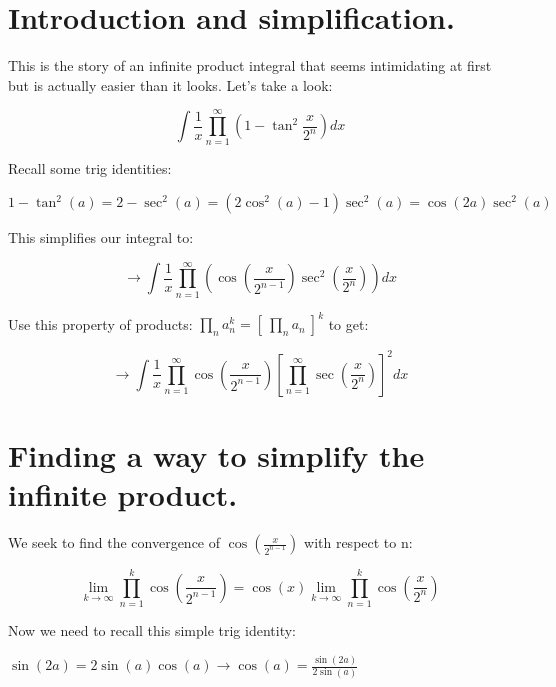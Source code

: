 \documentclass{article}
\begin{document}
\section{Introduction and simplification.}

This is the story of an infinite product integral that seems intimidating at first but is actually easier than it looks. Let's take a look:

\begin{equation}
    \int{ \frac{1}{x} \prod_{n=1}^{\infty} \left( 1-\tan^2{\frac{x}{2^n}} \right) dx}
\end{equation}

Recall some trig identities:

\begin{center}
    $1-\tan^2{(a)}=2-\sec^2{(a)}=\left(2\cos^2{(a)}-1\right)\sec^2{(a)}= \cos{(2a)}\sec^2{(a)}$
\end{center}

This simplifies our integral to:

\begin{equation}
\rightarrow \int{ \frac{1}{x} \prod_{n=1}^{\infty} \left( \cos{\left( \frac{x}{2^{n-1}}\right)} \sec^2{\left( \frac{x}{2^n} \right)}  \right) dx}
\end{equation}

Use this property of products: $\prod_{n}{a_{n}^k}=\left [ \: \prod_n{a_n} \: \right]^k$ to get:

\begin{equation}
    \rightarrow \int{ \frac{1}{x} \prod_{n=1}^{\infty}  \cos{\left( \frac{x}{2^{n-1}}\right)} \left[ \prod_{n=1}^{\infty}\sec{\left( \frac{x}{2^n} \right)}  \right]^2  dx}
\end{equation}

\section{Finding a way to simplify the infinite product.}
We seek to find the convergence of $\cos{ \left( \frac{x}{2^{n-1}} \right) }$ with respect to n:

\begin{equation}
    \lim_{k\rightarrow \infty} {\prod_{n=1}^{k}} \cos{\left( \frac{x}{2^{n-1}}\right)}=\cos{\left(x\right)}\lim_{k\rightarrow \infty} \prod_{n=1}^{k} \cos{\left( \frac{x}{2^n}\right)}
\end{equation}


Now we need to recall this simple trig identity:

\begin{center}
        $ \sin{(2a)}=2\sin{(a)}\cos{(a)}\rightarrow \cos{(a)}=\frac{\sin{(2a)}}{2\sin{(a)}}$
\end{center}
\end{document}
